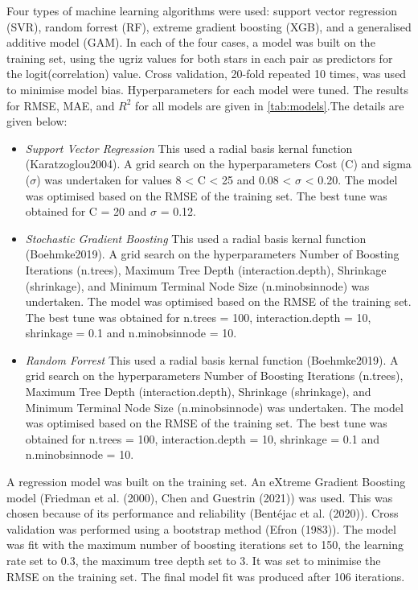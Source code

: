 \documentclass[]{elsarticle} %
\begin{document}
Four types of machine learning algorithms were used: support vector
regression (SVR), random forrest (RF), extreme gradient boosting (XGB),
and a generalised additive model (GAM). In each of the four cases, a
model was built on the training set, using the ugriz values for both
stars in each pair as predictors for the logit(correlation) value. Cross
validation, 20-fold repeated 10 times, was used to minimise model bias.
Hyperparameters for each model were tuned. The results for RMSE, MAE,
and \(R^2\) for all models are given in \ref{tab:models}.The details are
given below:

\begin{itemize}
\item
  \emph{Support Vector Regression} This used a radial basis kernal
  function (Karatzoglou2004). A grid search on the hyperparameters Cost
  (C) and sigma (\(\sigma\)) was undertaken for values 8 \textless{} C
  \textless{} 25 and 0.08 \textless{} \(\sigma\) \textless{} 0.20. The
  model was optimised based on the RMSE of the training set. The best
  tune was obtained for C = 20 and \(\sigma\) = 0.12.
\item
  \emph{Stochastic Gradient Boosting} This used a radial basis kernal
  function (Boehmke2019). A grid search on the hyperparameters Number of
  Boosting Iterations (n.trees), Maximum Tree Depth (interaction.depth),
  Shrinkage (shrinkage), and Minimum Terminal Node Size (n.minobsinnode)
  was undertaken. The model was optimised based on the RMSE of the
  training set. The best tune was obtained for n.trees = 100,
  interaction.depth = 10, shrinkage = 0.1 and n.minobsinnode = 10.
\item
  \emph{Random Forrest} This used a radial basis kernal function
  (Boehmke2019). A grid search on the hyperparameters Number of Boosting
  Iterations (n.trees), Maximum Tree Depth (interaction.depth),
  Shrinkage (shrinkage), and Minimum Terminal Node Size (n.minobsinnode)
  was undertaken. The model was optimised based on the RMSE of the
  training set. The best tune was obtained for n.trees = 100,
  interaction.depth = 10, shrinkage = 0.1 and n.minobsinnode = 10.
\end{itemize}

A regression model was built on the training set. An eXtreme Gradient
Boosting model (Friedman et al. (2000), Chen and Guestrin (2021)) was
used. This was chosen because of its performance and reliability
(Bentéjac et al. (2020)). Cross validation was performed using a
bootstrap method (Efron (1983)). The model was fit with the maximum
number of boosting iterations set to 150, the learning rate set to 0.3,
the maximum tree depth set to 3. It was set to minimise the RMSE on the
training set. The final model fit was produced after 106 iterations.
\end{document}
